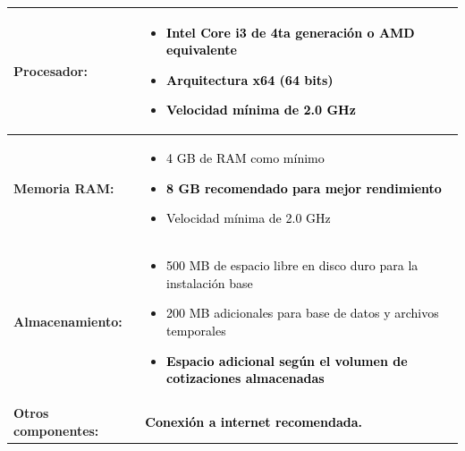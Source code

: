 \documentclass{Pretexto/bluereport}
\begin{document}
\begin{center}
\begin{tcolorbox}[
    enhanced,
    boxrule=2pt,
    colframe=primaryblue,
    colback=light,
    rounded corners=5pt,
    width=0.98\textwidth
]

\renewcommand{\arraystretch}{1.6}
\begin{tabular}{>{\raggedright\bfseries}p{3.5cm} 
                >{\raggedright\arraybackslash}p{9.5cm}}

\textcolor{primaryblue}{Procesador:} & 
\begin{minipage}[t]{9cm}
\vspace{-0.3cm}
\begin{itemize}[leftmargin=10pt, itemsep=2pt]
    \item \textcolor{black}{Intel Core i3 de 4ta generación o AMD equivalente}
    \item \textcolor{black}{Arquitectura x64 (64 bits)}
    \item \textcolor{black}{\textbf{Velocidad mínima de 2.0 GHz}}
\end{itemize}
\vspace{0.7cm}
\end{minipage} \\[8pt]
\hline
\textcolor{primaryblue}{Memoria RAM:} & 
\begin{minipage}[t]{9cm}
\vspace{-0.3cm}
\begin{itemize}[leftmargin=10pt, itemsep=2pt]
    \item \textcolor{black}{4 GB de RAM como mínimo}
    \item \textcolor{black}{\textbf{8 GB recomendado para mejor rendimiento}}
    \item \textcolor{black}{Velocidad mínima de 2.0 GHz}
\end{itemize}
\vspace{0.7cm}
\end{minipage} \\[8pt]
\hline
\textcolor{primaryblue}{Almacenamiento:} & 
\begin{minipage}[t]{9cm}
\vspace{-0.3cm}
\begin{itemize}[leftmargin=10pt, itemsep=2pt]
    \item \textcolor{black}{500 MB de espacio libre en disco duro para la instalación base}
    \item \textcolor{black}{200 MB adicionales para base de datos y archivos temporales}
    \item \textcolor{black}{\textbf{Espacio adicional según el volumen de cotizaciones almacenadas}}
\end{itemize}
\vspace{0.7cm}
\end{minipage} \\[8pt]
\hline
\textcolor{primaryblue}{Otros componentes:} & 
\textcolor{black}{\textbf{Conexión a internet recomendada.}} \\[5pt]

\end{tabular}
\end{tcolorbox}
\end{center}
\end{document}

